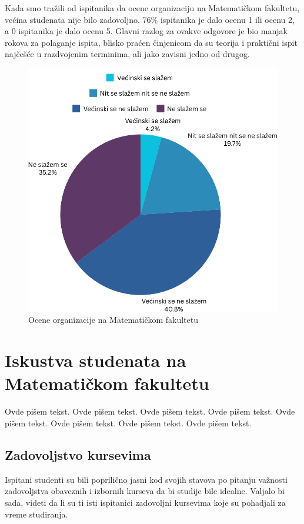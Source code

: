 \documentclass[a4paper]{article}
\begin{document}
Kada smo tražili od ispitanika da ocene organizaciju na Matematičkom fakultetu, većina studenata nije bilo zadovoljno. 76\% ispitanika je dalo ocenu 1 ili ocenu 2, a 0 ispitanika je dalo ocenu 5. Glavni razlog za ovakve odgovore je bio manjak rokova za polaganje ispita, blisko praćen činjenicom da su teorija i praktični ispit najčešće u razdvojenim terminima, ali jako zavisni jedno od drugog.\\
\begin{figure}[h!]
\begin{center}
    \includegraphics[scale = 0.3]{PieChartOrganizacijaMatf.png}
    \caption{Ocene organizacije na Matematičkom fakultetu}
    \label{fig:organizacija_matf}
\end{center}
\end{figure}






\section{Iskustva studenata na Matematičkom fakultetu}

Ovde pišem tekst. 
Ovde pišem tekst. 
Ovde pišem tekst. 
Ovde pišem tekst. 
Ovde pišem tekst. 
Ovde pišem tekst. 
Ovde pišem tekst. 
Ovde pišem tekst.

\subsection{Zadovoljstvo kursevima}
Ispitani studenti su bili poprilično jasni kod svojih stavova po pitanju važnosti zadovoljstva obaveznih i izbornih kurseva da bi studije bile idealne. Valjalo bi sada, videti da li su ti isti ispitanici zadovoljni kursevima koje su pohadjali za vreme studiranja.
\end{document}
